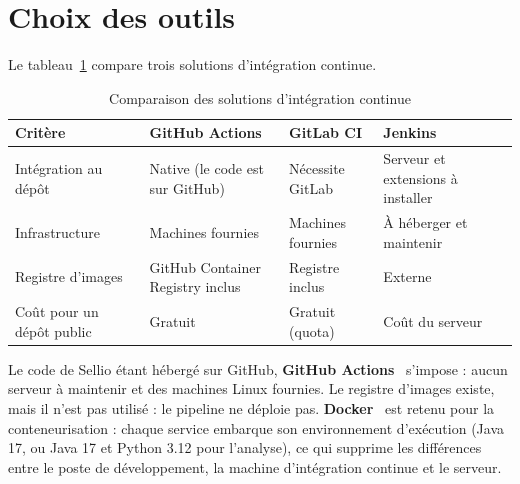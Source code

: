 \section{Choix des outils}
Le tableau~\ref{tab:choix-ci} compare trois solutions d'intégration continue.
\begin{table}[H]
\centering
\renewcommand{\arraystretch}{1.35}
\small
\begin{tabular}{|p{3.6cm}|p{3.7cm}|p{3.7cm}|p{3.7cm}|}
\hline
\textbf{Critère} & \textbf{GitHub Actions} & \textbf{GitLab CI} & \textbf{Jenkins} \\
\hline
Intégration au dépôt & Native (le code est sur GitHub) & Nécessite GitLab & Serveur et extensions à installer \\
\hline
Infrastructure & Machines fournies & Machines fournies & À héberger et maintenir \\
\hline
Registre d'images & GitHub Container Registry inclus & Registre inclus & Externe \\
\hline
Coût pour un dépôt public & Gratuit & Gratuit (quota) & Coût du serveur \\
\hline
\end{tabular}
\caption{Comparaison des solutions d'intégration continue}
\label{tab:choix-ci}
\end{table}
Le code de Sellio étant hébergé sur GitHub, \textbf{GitHub Actions}~\cite{githubactions} s'impose : aucun serveur à maintenir et des machines Linux fournies. Le registre d'images existe, mais il n'est pas utilisé : le pipeline ne déploie pas. \textbf{Docker}~\cite{docker} est retenu pour la conteneurisation : chaque service embarque son environnement d'exécution (Java 17, ou Java 17 et Python 3.12 pour l'analyse), ce qui supprime les différences entre le poste de développement, la machine d'intégration continue et le serveur.


